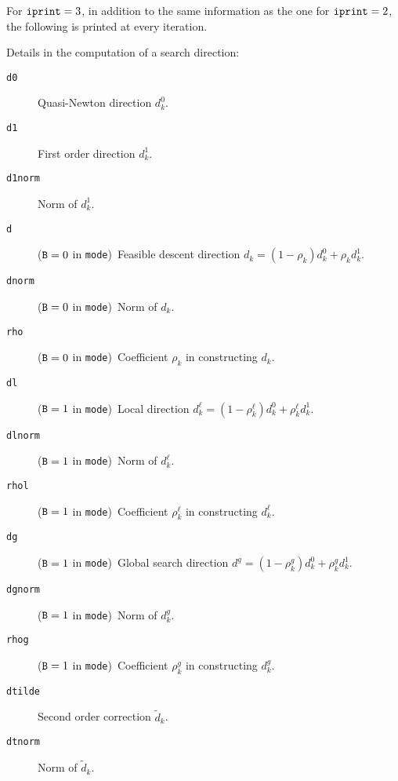{\noindent}For ${\tt iprint}=3$, in addition to the same 
         information as the one for ${\tt iprint}=2$, 
         the following is printed at every iteration.

\vspace{1em}
Details in the computation of a search direction:
\begin{description}
\item[\tt d0]      Quasi-Newton direction $d^0_k$.
\item[\tt d1]      First order direction $d^1_k$.
\item[\tt d1norm]  Norm of $d^1_k$.
\item[\tt d]       (${\tt B}=0$ in {\tt mode})~Feasible descent 
                   direction $d_k=(1-\rho _k)d^0_k+\rho _k d^1_k$.
\item[\tt dnorm]   (${\tt B}=0$ in {\tt mode})~Norm of $d_k$.
\item[\tt rho]     (${\tt B}=0$ in {\tt mode})~Coefficient $\rho_k$ in 
                   constructing $d_k$.
\item[\tt dl]      (${\tt B}=1$ in {\tt mode})~Local direction 
                    $d^\ell_k=(1-\rho^\ell_k)d_k^0+\rho^\ell_kd^1_k$.
\item[\tt dlnorm]  (${\tt B}=1$ in {\tt mode})~Norm of $d_k^\ell$.
\item[\tt rhol]    (${\tt B}=1$ in {\tt mode})~Coefficient $\rho_k^{\ell}$ in
                   constructing $d_k^{\ell}$.
\item[\tt dg]      (${\tt B}=1$ in {\tt mode})~Global search direction 
                    $d^g=(1-\rho^g_k)d_k^0+\rho^g_kd^1_k$.
\item[\tt dgnorm]  (${\tt B}=1$ in {\tt mode})~Norm of $d_k^g$.
\item[\tt rhog]    (${\tt B}=1$ in {\tt mode})~Coefficient $\rho_k^g$ in 
                   constructing $d_k^g$.
\item[\tt dtilde]  Second order correction $\tilde d_k$.
\item[\tt dtnorm]  Norm of $\tilde d_k$.
\end{description}

